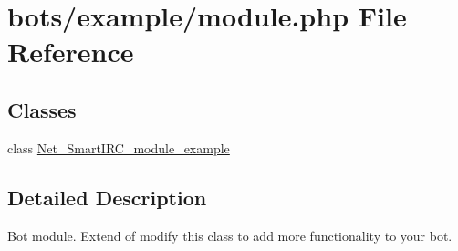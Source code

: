\hypertarget{example_2module_8php}{}\section{bots/example/module.php File Reference}
\label{example_2module_8php}
\subsection*{Classes}
\begin{DoxyCompactItemize}
\item 
class \hyperlink{classNet__SmartIRC__module__example}{Net\+\_\+\+Smart\+I\+R\+C\+\_\+module\+\_\+example}
\end{DoxyCompactItemize}


\subsection{Detailed Description}
Bot module. Extend of modify this class to add more functionality to your bot. 